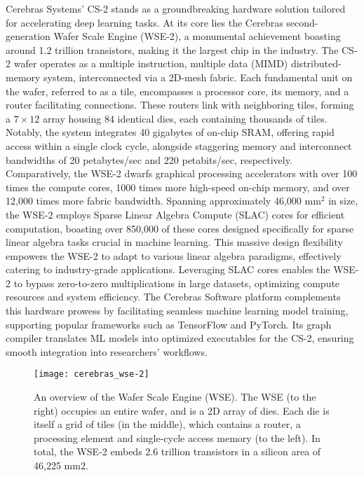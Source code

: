 Cerebras Systems' CS-2 stands as a groundbreaking hardware solution tailored for accelerating deep learning tasks. At its core lies the Cerebras second-generation Wafer Scale Engine (WSE-2), a monumental achievement boasting around 1.2 trillion transistors, making it the largest chip in the industry. The CS-2 wafer operates as a multiple instruction, multiple data (MIMD) distributed-memory system, interconnected via a 2D-mesh fabric. Each fundamental unit on the wafer, referred to as a tile, encompasses a processor core, its memory, and a router facilitating connections. These routers link with neighboring tiles, forming a $7 \times 12$ array housing 84 identical dies, each containing thousands of tiles. Notably, the system integrates 40 gigabytes of on-chip SRAM, offering rapid access within a single clock cycle, alongside staggering memory and interconnect bandwidths of 20 petabytes/sec and 220 petabits/sec, respectively. Comparatively, the WSE-2 dwarfs graphical processing accelerators with over 100 times the compute cores, 1000 times more high-speed on-chip memory, and over 12,000 times more fabric bandwidth. Spanning approximately 46,000 mm$^2$ in size, the WSE-2 employs Sparse Linear Algebra Compute (SLAC) cores for efficient computation, boasting over 850,000 of these cores designed specifically for sparse linear algebra tasks crucial in machine learning. This massive design flexibility empowers the WSE-2 to adapt to various linear algebra paradigms, effectively catering to industry-grade applications. Leveraging SLAC cores enables the WSE-2 to bypass zero-to-zero multiplications in large datasets, optimizing compute resources and system efficiency. The Cerebras Software platform complements this hardware prowess by facilitating seamless machine learning model training, supporting popular frameworks such as TensorFlow and PyTorch. Its graph compiler translates ML models into optimized executables for the CS-2, ensuring smooth integration into researchers' workflows.

\begin{figure}[h!]
    \texttt{[image: cerebras\_wse-2]}
    \centering
    \caption{An overview of the Wafer Scale Engine (WSE). The WSE (to the right) occupies an entire wafer, and is a
    2D array of dies. Each die is itself a grid of tiles (in the middle), which contains a router, a processing element and
    single-cycle access memory (to the left). In total, the WSE-2 embeds 2.6 trillion transistors in a silicon area of 46,225
    mm2. \cite{9}}
\end{figure}

